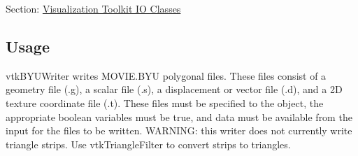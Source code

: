 Section\-: \hyperlink{sec_vtkio}{Visualization Toolkit I\-O Classes} \hypertarget{vtkwidgets_vtkxyplotwidget_Usage}{}\subsection{Usage}\label{vtkwidgets_vtkxyplotwidget_Usage}
vtk\-B\-Y\-U\-Writer writes M\-O\-V\-I\-E.\-B\-Y\-U polygonal files. These files consist of a geometry file (.g), a scalar file (.s), a displacement or vector file (.d), and a 2\-D texture coordinate file (.t). These files must be specified to the object, the appropriate boolean variables must be true, and data must be available from the input for the files to be written. W\-A\-R\-N\-I\-N\-G\-: this writer does not currently write triangle strips. Use vtk\-Triangle\-Filter to convert strips to triangles.


